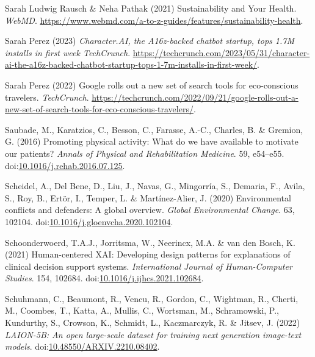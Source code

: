 \documentclass[
  letterpaper,
  DIV=11,
  numbers=noendperiod]{scrartcl}
\newlength{\cslhangindent}
\newenvironment{CSLReferences}[2] %
 {\begin{list}{}{%
  \setlength{\itemindent}{0pt}
  \setlength{\leftmargin}{0pt}
  \setlength{\parsep}{0pt}
  \ifodd #1
   \setlength{\leftmargin}{\cslhangindent}
   \setlength{\itemindent}{-1\cslhangindent}
  \fi
  \setlength{\itemsep}{#2\baselineskip}}}
 {\end{list}}
\begin{document}
\begin{CSLReferences}{0}{1}
Sarah Ludwig Rausch \& Neha Pathak (2021) Sustainability and {Your
Health}. \emph{WebMD}.
\url{https://www.webmd.com/a-to-z-guides/features/sustainability-health}.

Sarah Perez (2023) \emph{Character.{AI}, the A16z-backed chatbot
startup, tops 1.{7M} installs in first week {\textbar} {TechCrunch}}.
\url{https://techcrunch.com/2023/05/31/character-ai-the-a16z-backed-chatbot-startup-tops-1-7m-installs-in-first-week/}.

Sarah Perez (2022) Google rolls out a new set of search tools for
eco-conscious travelers. \emph{TechCrunch}.
\url{https://techcrunch.com/2022/09/21/google-rolls-out-a-new-set-of-search-tools-for-eco-conscious-travelers/}.

Saubade, M., Karatzios, C., Besson, C., Farasse, A.-C., Charles, B. \&
Gremion, G. (2016) Promoting physical activity: {What} do we have
available to motivate our patients? \emph{Annals of Physical and
Rehabilitation Medicine}. 59, e54--e55.
doi:\href{https://doi.org/10.1016/j.rehab.2016.07.125}{10.1016/j.rehab.2016.07.125}.

Scheidel, A., Del Bene, D., Liu, J., Navas, G., Mingorría, S., Demaria,
F., Avila, S., Roy, B., Ertör, I., Temper, L. \& Martínez-Alier, J.
(2020) Environmental conflicts and defenders: {A} global overview.
\emph{Global Environmental Change}. 63, 102104.
doi:\href{https://doi.org/10.1016/j.gloenvcha.2020.102104}{10.1016/j.gloenvcha.2020.102104}.

Schoonderwoerd, T.A.J., Jorritsma, W., Neerincx, M.A. \& van den Bosch,
K. (2021) Human-centered {XAI}: {Developing} design patterns for
explanations of clinical decision support systems. \emph{International
Journal of Human-Computer Studies}. 154, 102684.
doi:\href{https://doi.org/10.1016/j.ijhcs.2021.102684}{10.1016/j.ijhcs.2021.102684}.

Schuhmann, C., Beaumont, R., Vencu, R., Gordon, C., Wightman, R.,
Cherti, M., Coombes, T., Katta, A., Mullis, C., Wortsman, M.,
Schramowski, P., Kundurthy, S., Crowson, K., Schmidt, L., Kaczmarczyk,
R. \& Jitsev, J. (2022) \emph{{LAION-5B}: {An} open large-scale dataset
for training next generation image-text models}.
doi:\href{https://doi.org/10.48550/ARXIV.2210.08402}{10.48550/ARXIV.2210.08402}.


\end{CSLReferences}
\end{document}
